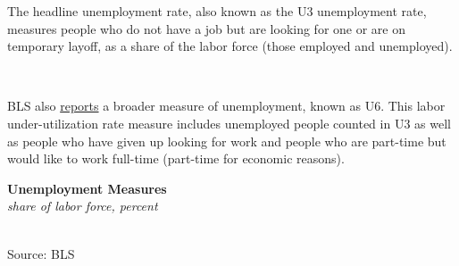 \documentclass{report}
\makeatletter
\newcommand{\tbllink}[1]{\href{https://raw.githubusercontent.com/bdecon/US-chartbook/master/chartbook/data/#1}{\faTable}}
\newcommand*\short[1]{\expandafter\@gobbletwo\number\numexpr#1\relax}
\newcommand{\stdnode}[3]{\node[below, align=left, shift=({#1,#2})]{#3};}
\newcommand{\shdateaxisticks}{
		date coordinates in=x, axis line style={draw=none},
		xmax={2021-02-01},
		max space between ticks=40,	    
		xtick={{1990-01-01}, {1995-01-01}, {2000-01-01}, 
			{2005-01-01}, {2010-01-01}, {2015-01-01}, {2020-01-01}},
		minor xtick={},
		enlarge y limits={0.06}, enlarge x limits={0.01},
		}
\newcommand{\bbar}[2]{extra #1 ticks = {{#2}}, extra #1 tick labels = ,
		extra #1 tick style = {grid=major, grid style={thick, black!25}},}
\newcommand{\stdline}[4]{\addplot[very thick, no markers, color=#1] 
		table [x=#2, y=#3, col sep=comma] {#4};	}
\newcommand{\rbars}{
		\fill[color=black!10] (axis cs:{1990-07-01},\pgfkeysvalueof{/pgfplots/ymin}) rectangle 
			(axis cs:{1991-03-01}, \pgfkeysvalueof{/pgfplots/ymax});
		\fill[color=black!10] (axis cs:{2007-12-01},\pgfkeysvalueof{/pgfplots/ymin}) rectangle 
			(axis cs:{2009-07-01}, \pgfkeysvalueof{/pgfplots/ymax});
		\fill[color=black!10] (axis cs:{2001-03-01},\pgfkeysvalueof{/pgfplots/ymin}) rectangle 
			(axis cs:{2001-11-01}, \pgfkeysvalueof{/pgfplots/ymax});}
\makeatother
\begin{document}
{{{{{{{{\begin{minipage}{0.76\textwidth}
\small The headline unemployment rate, also known as the U3 unemployment rate, measures people who do not have a job but are looking for one or are on temporary layoff, as a share of the labor force (those employed and unemployed). 
\end{minipage}\\

\begin{minipage}{0.37\textwidth}
\small BLS also \href{https://www.bls.gov/news.release/empsit.t15.htm}{reports} a broader measure of unemployment, known as U6. This labor under-utilization rate measure includes unemployed people counted in U3 as well as people who have given up looking for work and people who are part-time but would like to work full-time (part-time for economic reasons). \\
\end{minipage}\hspace{6mm}
\begin{minipage}{0.41\textwidth}
\normalsize \textbf{Unemployment Measures}\\
\footnotesize{\textit{share of labor force, percent}}\\
\noindent \hspace*{-2mm} \\
\footnotesize{Source: BLS} \hspace{31mm} \tbllink{unemp2.csv}

\end{minipage}\\

\begin{minipage}{0.76\textwidth}
\small \\

\vspace{1mm}


\end{minipage}}}}}}}}}
\end{document}
